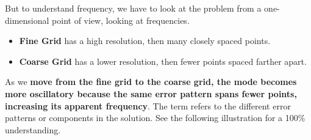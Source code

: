\noindent
But to understand frequency, we have to look at the problem from a one-dimensional point of view, looking at frequencies.
\begin{itemize}
    \item \textbf{Fine Grid} has a high resolution, then many closely spaced points.
    \begin{center}
    \end{center}

    \item \textbf{Coarse Grid} has a lower resolution, then fewer points spaced farther apart.
    \begin{center}
    \end{center}
\end{itemize}

\newpage

\noindent
As we \textbf{move from the fine grid to the coarse grid, the mode becomes more oscillatory because the same error pattern spans fewer points, increasing its apparent frequency}. The term  refers to the different error patterns or components in the solution. See the following illustration for a 100\% understanding.

